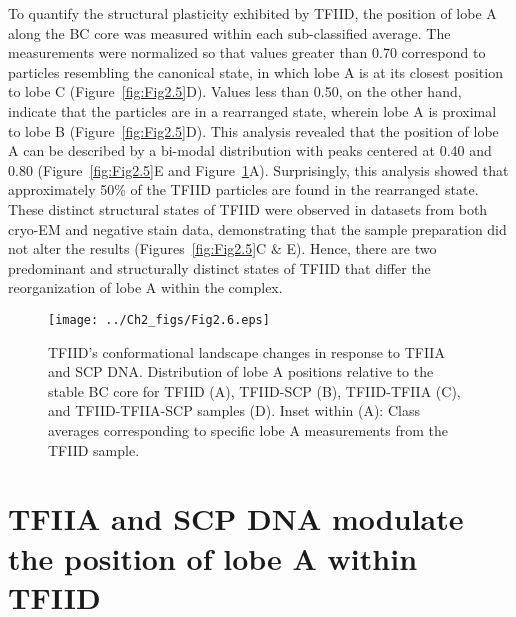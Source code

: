 \indent To quantify the structural plasticity exhibited by TFIID, the position of lobe A along the BC core was measured within each sub-classified average. The measurements were normalized so that values greater than 0.70 correspond to particles resembling the canonical state, in which lobe A is at its closest position to lobe C (Figure~\ref{fig:Fig2.5}D). Values less than 0.50, on the other hand, indicate that the particles are in a rearranged state, wherein lobe A is proximal to lobe B (Figure~\ref{fig:Fig2.5}D). This analysis revealed that the position of lobe A can be described by a bi-modal distribution with peaks centered at 0.40 and 0.80 (Figure~\ref{fig:Fig2.5}E and Figure~\ref{fig:Fig2.6}A). Surprisingly, this analysis showed that approximately 50\% of the TFIID particles are found in the rearranged state. These distinct structural states of TFIID were observed in datasets from both cryo-EM and negative stain data, demonstrating that the sample preparation did not alter the results (Figures~\ref{fig:Fig2.5}C \& E). Hence, there are two predominant and structurally distinct states of TFIID that differ the reorganization of lobe A within the complex.
\begin{figure}
\centering
\texttt{[image: ../Ch2\_figs/Fig2.6.eps]}
\caption[TFIID$’$s conformational landscape changes in response to TFIIA and SCP DNA]{TFIID’s conformational landscape changes in response to TFIIA and SCP DNA. Distribution of lobe A positions relative to the stable BC core for TFIID (A), TFIID-SCP (B), TFIID-TFIIA (C), and TFIID-TFIIA-SCP samples (D). Inset within (A): Class averages corresponding to specific lobe A measurements from the TFIID sample.}
\label{fig:Fig2.6}
\end{figure}
\section{TFIIA and SCP DNA modulate the position of lobe A within TFIID}
